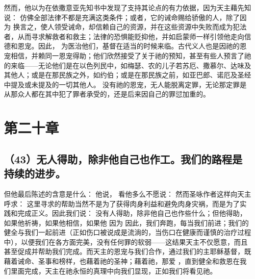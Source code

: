 然而，他以为在依撒意亚先知书中发现了支持其论点的有力依据，因为天主藉先知说：  仿佛全部法律不都是充满这类条件；或者，它的诫命赐给骄傲的人，除了因为    换言之，使人领受诫命，却信赖自己的资源，并在这些资源中失败而成为犯法者，从而寻求解救者和救主；法律的恐惧能贬抑他，并如启蒙师一样引领他走向信德和恩宠。因此， 为医治他们，基督在适当的时候来临。古代义人也是因祂的恩宠相信，并赖同一恩宠得助；他们欣然接受了关于祂的预知，甚至有些人预言了祂的来临——无论他们是在以色列民中，如梅瑟、农的儿子若苏厄、撒慕尔、达味及其他人；或是在那民族之外，如约伯；或是在那民族之前，如亚巴郎、诺厄及圣经中提及或未提及的一切其他人。  没有祂的恩宠，无人能脱离定罪，无论那定罪是从那众人都在其中犯了罪者承受的，还是后来因自己的罪愆加重的。\par


\section{第二十章}


\subsection{（43）无人得助，除非他自己也作工。我们的路程是持续的进步。}

但他最后陈述的含意是什么： 他说， 看他多么不愿说： 然而圣咏作者这样向天主呼求： 这里寻求的帮助当然不是为了获得肉身利益和避免肉身灾祸，而是为了实践和完成正义。因此我们说：  没有人得助，除非他自己也作些什么；但他得助，如果他祈祷，如果他相信，如果他  因为  因此，我们奔跑，每当我们前进；我们的健全与我们一起前进（正如伤口被说成是流淌的，当伤口在健康而谨慎的治疗过程中），以便我们在各方面完美，没有任何罪的软弱——这结果天主不仅愿意，而且甚至促成并帮助我们完成。而天主的恩宠与我们合作，通过我们的主耶稣基督，既藉着诫命、圣事和榜样，也藉着祂的圣神；藉着祂，那爱    ，直到健全和救恩在我们里面完成，天主在祂永恒的真理中向我们显现，正如我们将看见祂。\par

